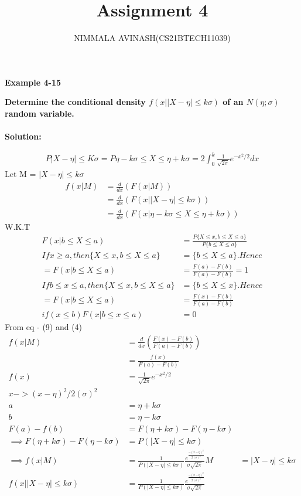 \documentclass[journal,twocolumn]{IEEEtran}
\title{Assignment 4}
\author{NIMMALA AVINASH(CS21BTECH11039)}
\begin{document}
\maketitle

{\LARGE \textbf{Example 4-15\\}}

{\Large \textbf{Determine the conditional density  $ f(x|\vert X-\eta\vert\leq k\sigma) $ of an $N(\eta;\sigma)$ random variable.\\}}\\
{\Large \textbf{Solution:}}

\begin{align}
P{|X-\eta|\leq K\sigma} = P{\eta-k\sigma \leq X \leq \eta + k\sigma } = 2 \int_{0}^{k} \frac{1}{\sqrt{2\pi}} e^{-x^{2}/2}dx 
\end{align}
Let M = $ |X-\eta|\leq k\sigma $
\begin{align}
f(x|M) &= \frac{d}{dx}(F(x|M))\\
&=\frac{d}{dx}(F(x||X-\eta|\leq k\sigma))\\
&=\frac{d}{dx}(F(x|\eta-k\sigma\leq X \leq \eta + k\sigma))
\end{align}
W.K.T 
\begin{align}
F(x|b\leq X \leq a) &= \frac{P\{X\leq x,b\leq X \leq a\}}{P\{b \leq X\leq a\}}\\
If x\geq a,then \{X \leq x,b\leq X \leq a\} &= \{b\leq X \leq a\}.Hence\\
=F(x|b\leq X \leq a) &= \frac{F(a)-F(b)}{F(a)-F(b)} = 1 \\
If b\leq x \leq a,then \{X\leq x,b \leq X \leq a\} &= \{b \leq X \leq x\}.Hence\\
=F(x|b\leq X \leq a) &= \frac{F(x)-F(b)}{F(a)-F(b)}\\
if(x\leq b) F(x | b\leq x \leq a) &= 0 
\end{align}
From eq - (9) and (4)
\begin{align}
f(x|M) &= \frac{d}{dx} (\frac{F(x)-F(b)}{F(a)-F(b)})\\
&= \frac{f(x)}{F(a)-F(b)}\\
f(x) &= \frac{1}{\sqrt{2\pi}}e^{-x^{2}/2}\\
x -> (x-\eta)^{2}/2(\sigma)^{2}\\
a &= \eta +k\sigma\\
b &= \eta -k\sigma\\
F(a)-f(b) &= F(\eta +k\sigma)-F(\eta -k\sigma)\\
\implies 
F(\eta +k\sigma)-F(\eta -k\sigma) &= P(|X-\eta|\leq k\sigma )\\
\implies f(x|M) &= \frac{1}{P(|X-\eta|\leq k\sigma)}\frac{e^{\frac{-(x-\eta)^{2}}{2(\sigma)^{2}}}}{\sigma \sqrt{2\pi}}
M &= |X - \eta|\leq k\sigma\\
f(x||X-\eta|\leq k \sigma ) &= \frac{1}{P(|X-\eta|\leq k\sigma)}\frac{e^{\frac{-(x-\eta)^{2}}{2(\sigma)^{2}}}}{\sigma \sqrt{2\pi}}
\end{align}
\end{document}
